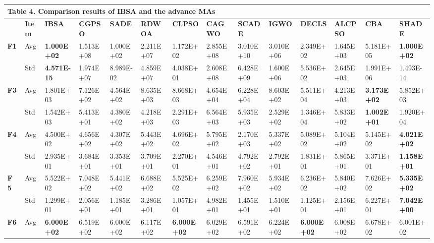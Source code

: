 \documentclass{article} %
\begin{document}
\begin{tabular}{|p{0.2in}|p{0.2in}|p{0.4in}|p{0.4in}|p{0.4in}|p{0.4in}|p{0.4in}|p{0.4in}|p{0.4in}|p{0.4in}|p{0.4in}|p{0.4in}|p{0.4in}|p{0.4in}|} \hline 
\multicolumn{13}{|p{4.5in}|}{\textbf{Table }4\textbf{. }Comparison results of IBSA and the advance MAs\textbf{}} & \textbf{} \\ \hline 
 & \textbf{Item} & \textbf{IBSA} & \textbf{CGPSO} & \textbf{SADE} & \textbf{RDWOA} & \textbf{CLPSO} & \textbf{CAGWO} & \textbf{SCADE} & \textbf{IGWO} & \textbf{DECLS} & \textbf{ALCPSO} & \textbf{CBA} & \textbf{SHADE} \\ \hline 
\textbf{F1} & Avg & \textbf{1.000E+02} & 1.513E+08 & 1.000E+02 & 2.211E+07 & 1.172E+02 & 2.855E+08 & 3.010E+10 & 3.010E+06 & 2.349E+02 & 1.645E+03 & 5.181E+05 & \textbf{1.000E+02} \\ \hline 
\textbf{} & Std & \textbf{4.571E-15} & 1.974E+07 & 8.989E-02 & 4.859E+07 & 4.038E+01 & 2.608E+08 & 6.428E+09 & 1.600E+06 & 5.536E+02 & 2.645E+03 & 1.991E+06 & 1.493E-14 \\ \hline 
\textbf{F3} & Avg & 1.801E+03 & 7.126E+02 & 4.564E+02 & 8.635E+03 & 8.668E+03 & 4.654E+04 & 6.228E+04 & 8.603E+02 & 5.511E+04 & 4.213E+03 & \textbf{3.173E+02} & 5.852E+03 \\ \hline 
\textbf{} & Std & 1.542E+03 & 5.413E+01 & 4.380E+02 & 4.218E+03 & 2.291E+03 & 6.564E+03 & 5.935E+03 & 2.529E+02 & 1.346E+04 & 5.833E+02 & \textbf{1.002E+01} & 1.920E+04 \\ \hline 
\textbf{F4} & Avg & 4.500E+02 & 4.656E+02 & 4.307E+02 & 5.443E+02 & 4.696E+02 & 5.795E+02 & 2.170E+03 & 5.337E+02 & 5.089E+02 & 5.104E+02 & 5.145E+02 & \textbf{4.021E+02} \\ \hline 
\textbf{} & Std & 2.935E+01 & 3.684E+01 & 3.353E+01 & 3.709E+01 & 2.270E+01 & 4.546E+01 & 4.792E+02 & 2.792E+01 & 1.831E+01 & 5.865E+01 & 3.371E+01 & \textbf{1.158E+01} \\ \hline 
\textbf{F~5} & Avg & 5.522E+02 & 7.048E+02 & 5.441E+02 & 6.688E+02 & 5.525E+02 & 6.259E+02 & 7.960E+02 & 5.934E+02 & 6.236E+02 & 5.840E+02 & 7.626E+02 & \textbf{5.335E+02} \\ \hline 
\textbf{} & Std & 1.299E+01 & 2.056E+01 & 1.185E+01 & 3.286E+01 & 1.057E+01 & 4.982E+01 & 1.455E+01 & 1.510E+01 & 1.125E+01 & 2.156E+01 & 6.227E+01 & \textbf{7.042E+00} \\ \hline 
\textbf{F6} & Avg & \textbf{6.000E+02} & 6.519E+02 & 6.000E+02 & 6.117E+02 & \textbf{6.000E+02} & 6.029E+02 & 6.591E+02 & 6.224E+02 & \textbf{6.000E+02} & 6.008E+02 & 6.678E+02 & 6.001E+02 \\ \hline 

\end{tabular}
\end{document}
